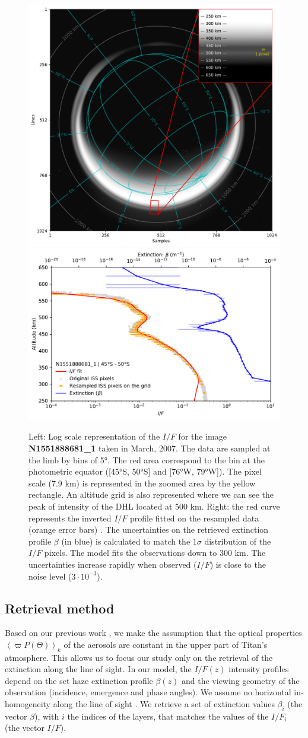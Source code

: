 \begin{figure}[!ht]
\includegraphics[width=.4\textwidth]{Fig/N1551888681_sampling}
\includegraphics[width=.57\textwidth]{Fig/Model_uncertainties}
\caption{Left: Log scale representation of the $I/F$  for the image
\textbf{N1551888681\_1} taken in March, 2007. The data are sampled at the limb by
bins of \ang{5}. The red area correspond to the bin at the photometric
equator ([\ang{45}S, \ang{50}S] and [\ang{76}W, \ang{79}W]). The pixel scale
(7.9 km) is represented in the zoomed area by the yellow rectangle.
An altitude grid is also represented where we can see the peak of intensity of the DHL
located at 500 km. Right: the red curve represents the inverted $I/F$ profile fitted
on the resampled data (orange error bars) .
The uncertainties on the retrieved extinction profile $\beta$ (in blue) is calculated to match the $1 \sigma$ distribution of the $I/F$ pixels. The model fits the observations down to 300 km.
The uncertainties increase rapidly when observed ($I/F$) is close
to the noise level ($3\cdot10^{-3}$).}
\label{fig:model_uncertainties}
\end{figure}


\subsection{Retrieval method}

Based on our previous work \citep{Seignovert2017, West2018}, we make the assumption that the optical properties $\left<\varpi P(\Theta)\right>_k$ of the aerosols are constant in the upper part of Titan's atmosphere. This allows us to focus our study only on the retrieval of the extinction along the line of sight.
In our model, the $I/F (z)$ intensity profiles depend on the set haze extinction profile $\beta(z)$ and the viewing geometry of the observation (incidence, emergence and phase angles).
We assume no horizontal in-homogeneity along the line of sight \citep{Seignovert2017}. We retrieve a set of extinction values $\beta_i$ (the vector ${\beta}$), with $i$ the indices of the layers, that matches the values of the $I/F_i$ (the vector $I/F$).


